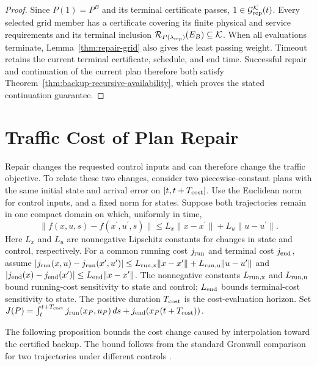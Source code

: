 \documentclass[final]{cas-sc}
\theoremstyle{definition}
\theoremstyle{plain}
\theoremstyle{definition}
\theoremstyle{plain}
\begin{document}
\begin{proof}
Since $P(1)=P^B$ and its terminal certificate passes,
$1\in\mathcal G_{\rm rep}^{\mathcal K}(t)$. Every selected grid
member has a certificate covering its finite physical and service
requirements and its terminal inclusion
$\mathcal R_{P(\lambda_{\rm rep})}(E_B)\subseteq\mathcal K$.
When all evaluations terminate, Lemma~\ref{thm:repair-grid} also gives
the least passing weight. Timeout retains the current terminal
certificate, schedule, and end time. Successful repair and continuation of the current plan
therefore both satisfy Theorem~\ref{thm:backup-recursive-availability},
which proves the stated continuation guarantee.
\end{proof}

\section{Traffic Cost of Plan Repair}
\label{sec:repair-cost-bound}
\label{app:repair-cost}

Repair changes the requested control inputs and can therefore change the
traffic objective. To relate these two changes, consider two piecewise-constant
plans with the same initial state and arrival error on $[t,t+T_{\rm cost}]$.
Use the Euclidean norm for control inputs, and a fixed norm for states.
Suppose both trajectories remain in one compact
domain on which, uniformly in time,
\[
\|f(x,u,s)-f(x^{\prime},u^{\prime},s)\|
\le L_x\|x-x^{\prime}\|+L_u\|u-u^{\prime}\|.
\]
Here $L_x$ and $L_u$ are nonnegative Lipschitz constants for changes
in state and control, respectively. For a common running cost
$j_{\rm run}$ and terminal cost $j_{\rm end}$, assume
$|j_{\rm run}(x,u)-j_{\rm run}(x^{\prime},u^{\prime})|\le L_{\rm run,x}\|x-x^{\prime}\|+
L_{\rm run,u}\|u-u^{\prime}\|$ and $|j_{\rm end}(x)-j_{\rm end}(x^{\prime})|\le L_{\rm end}\|x-x^{\prime}\|$.
The nonnegative constants $L_{\rm run,x}$ and $L_{\rm run,u}$ bound
running-cost sensitivity to state and control; $L_{\rm end}$ bounds
terminal-cost sensitivity to state. The positive duration $T_{\rm cost}$
is the cost-evaluation horizon. Set
$J(P)=\int_t^{t+T_{\rm cost}}j_{\rm run}(x_P,u_P)\,ds+j_{\rm end}(x_P(t+T_{\rm cost}))$.

The following proposition bounds the cost change caused by interpolation
toward the certified backup. The bound follows from the standard
Gronwall comparison for two trajectories under different controls
\cite{khalil2002nonlinear}.
\end{document}
